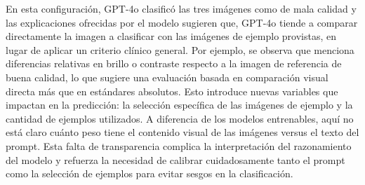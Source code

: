 En esta configuración, GPT-4o clasificó las tres imágenes como de mala calidad y las explicaciones ofrecidas por el modelo sugieren que, GPT-4o tiende a comparar directamente la imagen a clasificar con las imágenes de ejemplo provistas, en lugar de aplicar un criterio clínico general. Por ejemplo, se observa que menciona diferencias relativas en brillo o contraste respecto a la imagen de referencia de buena calidad, lo que sugiere una evaluación basada en comparación visual directa más que en estándares absolutos. Esto introduce nuevas variables que impactan en la predicción: la selección específica de las imágenes de ejemplo y la cantidad de ejemplos utilizados. A diferencia de los modelos entrenables, aquí no está claro cuánto peso tiene el contenido visual de las imágenes versus el texto del prompt. Esta falta de transparencia complica la interpretación del razonamiento del modelo y refuerza la necesidad de calibrar cuidadosamente tanto el prompt como la selección de ejemplos para evitar sesgos en la clasificación.

